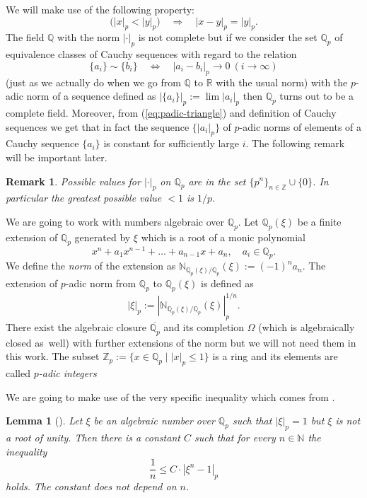 \documentclass[oneside]{amsart}
\def\N{\mathbb{N}}
\def\Z{\mathbb{Z}}
\def\Q{\mathbb{Q}}
\def\R{\mathbb{R}}
\newtheorem{lem}[thm]{Lemma}
\newtheorem{rmk}[thm]{Remark}
\begin{document}
We will make use of the following property:
\begin{equation}\label{eq:padic-triangle}
  \big( |x|_p < |y|_p \big) \quad \Longrightarrow \quad |x-y|_p = |y|_p.
\end{equation}
The field $\Q$ with the norm $|\cdot|_p$ is not complete but if we consider the set $\Q_p$
of equivalence classes of Cauchy sequences with regard to the relation
\[
  \{a_i\} \sim \{b_i\} \quad \Longleftrightarrow \quad |a_i - b_i|_p \to 0 \ (i \to \infty)
\]
(just as we actually do when we go from $\Q$ to $\R$ with the usual norm)
with the $p$-adic norm of a sequence defined as $\left|\{a_i\}\right|_p := \lim |a_i|_p$
then $\Q_p$ turns out to be a complete field.
Moreover, from (\ref{eq:padic-triangle}) and definition of Cauchy sequences we get
that in fact the sequence $\{|a_i|_p\}$ of $p$-adic norms of elements of a Cauchy sequence $\{a_i\}$
is constant for sufficiently large $i$.
The following remark will be important later.
\begin{rmk}\label{thm:possible-values-of-padic-norm}
  Possible values for $|\cdot|_p$ on $\Q_p$ are in the set $\{p^n\}_{n \in \Z} \cup \{0\}$.
  In particular the greatest possible value $<1$ is $1/p$.
\end{rmk}

We are going to work with numbers algebraic over $\Q_p$.
Let $\Q_p(\xi)$ be a finite extension of $\Q_p$ generated by $\xi$ which is a root of a monic polynomial
\[
  x^n + a_1 x^{n-1} + \dots + a_{n-1} x + a_n, \quad a_i \in \Q_p.
\]
We define the \emph{norm} of the extension as $\N_{\Q_p(\xi)/\Q_p}(\xi) := (-1)^n a_n$.
The extension of $p$-adic norm from $\Q_p$ to $\Q_p(\xi)$ is defined as
\[
  |\xi|_p := \left| \N_{\Q_p(\xi)/\Q_p}(\xi) \right|_p^{1/n}.
\]
There exist the algebraic closure $\overline{\Q_p}$ and its completion $\Omega$ (which is algebraically
closed as~well) with further extensions of the norm but we will not need them in this work.
The subset $\Z_p := \{ x \in \Q_p \mid |x|_p \leq 1 \}$ is a ring
and its elements are called \emph{$p$-adic integers}

We are going to make use of the very specific inequality
which comes from \cite[Theorem~6.1]{CEW}.

\begin{lem}[] \label{thm:FelSlo-lemma2.4}
  Let $\xi$ be an algebraic number over $\Q_p$ such that $|\xi|_p = 1$ but $\xi$ is not a root of unity.
  Then there is a constant $C$ such that for every $n \in \N$ the inequality
  \begin{equation} \label{eq:1/n-leq-x-1}
    \frac{1}{n} \leq C \cdot \left| \xi^n - 1 \right|_p
  \end{equation}
  holds. The constant does not depend on $n$.
\end{lem}
\end{document}
